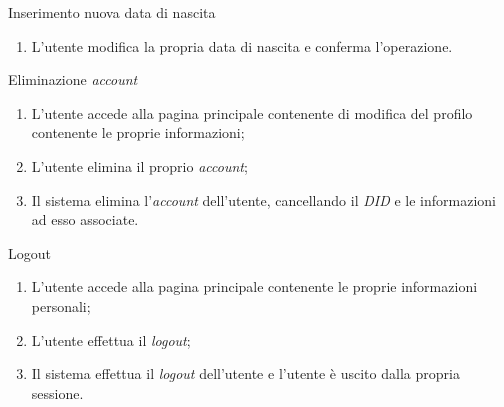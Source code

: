 \begin{usecase}{12.3}{Inserimento nuova data di nascita}\label{uc:modifica-data-nascita}
  \usecasemain{}
  
  \begin{enumerate}
    \item L'utente modifica la propria data di nascita e conferma l'operazione.
  \end{enumerate}
  
\end{usecase}

\begin{usecase}{13}{Eliminazione \textit{account}}\label{uc:eliminazione-account}
  \usecasemain{}
  
  \begin{enumerate}
    \item L'utente accede alla pagina principale contenente di modifica del profilo contenente le proprie informazioni;
    \item L'utente elimina il proprio \textit{account};
    \item Il sistema elimina l'\textit{account} dell'utente, cancellando il \textit{DID} e le informazioni ad esso associate.
  \end{enumerate}
\end{usecase}

\begin{usecase}{14}{Logout}\label{uc:logout}
  \usecasemain{}
  
  \begin{enumerate}
    \item L'utente accede alla pagina principale contenente le proprie informazioni personali;
    \item L'utente effettua il \textit{logout};
    \item Il sistema effettua il \textit{logout} dell'utente e l'utente è uscito dalla propria sessione.
  \end{enumerate}
\end{usecase}

